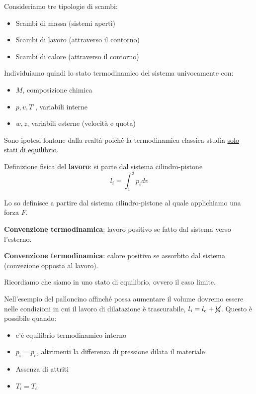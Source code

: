 \documentclass[a4paper]{article}
\numberwithin{equation}{section}%
\newcommand{\myequations}[1]{%
	\addcontentsline{equ}{myequations}{\protect\numberline{\theequation}#1}\par}
\begin{document}
Consideriamo tre tipologie di scambi:
\begin{itemize}
	\item Scambi di massa (sistemi aperti)
	\item Scambi di lavoro (attraverso il contorno)
	\item Scambi di calore (attraverso il contorno)
\end{itemize}

Individuiamo quindi lo stato termodinamico del sistema univocamente con:
\begin{itemize}
	\item $M$, composizione chimica
	\item $p,v,T$ , variabili interne 
	\item $w,z$, variabili esterne (velocità e quota)
\end{itemize}

Sono ipotesi lontane dalla realtà poiché la termodinamica classica studia \underline{solo stati di equilibrio}. 


 
Definizione fisica del \textbf{lavoro}: si parte dal sistema cilindro-pistone \begin{equation}
	l_i=\int_1^2 p_idv
\end{equation}
\label{lavoro}
\myequations{Lavoro}  

Lo so definisce a partire dal sistema cilindro-pistone al quale applichiamo una forza $F$. 

\textbf{Convenzione termodinamica}: lavoro positivo se fatto dal sistema verso l'esterno.

\textbf{Convenzione termodinamica}: calore positivo se assorbito dal sistema (convezione opposta al lavoro).

Ricordiamo che siamo in uno stato di equilibrio, ovvero il caso limite. 

Nell'esempio del palloncino affinché possa aumentare il volume dovremo essere nelle condizioni in cui il lavoro di dilatazione è trascurabile, $l_i=l_e+\cancel{l_d}$. Questo è possibile quando:
\begin{itemize}
	\item c'è equilibrio termodinamico interno
	\item $p_i=p_e$, altrimenti la differenza di pressione dilata il materiale
	\item Assenza di attriti
	\item $T_i=T_e$
\end{itemize}
\end{document}
